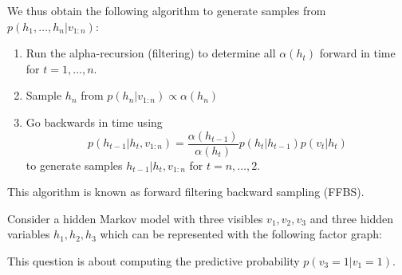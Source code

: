\begin{exenumerate}
    We thus obtain the following algorithm to generate samples from
    $p(h_1, \ldots, h_n|v_{1:n})$:
    \begin{enumerate}
    \item Run the alpha-recursion (filtering) to determine all
      $\alpha(h_t)$ forward in time for $t=1, \ldots, n$.
    \item Sample $h_n$ from $p(h_n | v_{1:n}) \propto \alpha(h_n)$
    \item Go backwards in time using
      \begin{equation}
        p(h_{t-1}|h_t, v_{1:n}) = \frac{\alpha(h_{t-1})}{\alpha(h_t)} p(h_t|h_{t-1}) p(v_t|h_t)
      \end{equation}
      to generate samples $h_{t-1}|h_t, v_{1:n}$ for $t=n, \ldots, 2$.
    \end{enumerate}
    This algorithm is known as forward filtering backward sampling (FFBS). 
    
\end{exenumerate}



 
 Consider a hidden Markov model with three visibles $v_1, v_2, v_3$
 and three hidden variables $h_1, h_2, h_3$ which can be represented
 with the following factor graph:
 
 \begin{center}
 \end{center}
 This question is about computing the predictive probability $p(v_3=1 | v_1 =1)$.

